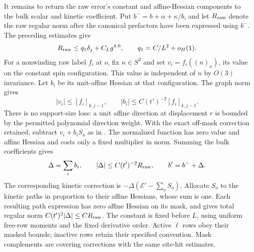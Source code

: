 It remains to return the raw error's constant and affine-Hessian
components to the bulk scalar and kinetic coefficient.  Put
$b^-=b+\alpha+\kappa/b$, and let $R_{\rm raw}$ denote the raw
regular norm after the canonical prefactors have been expressed using
$b^-$.  The preceding estimates give
\[
 R_{\rm raw}\le q_1\delta_j+C_Lg^{4.6},
 \qquad q_1=C/L^2+o_H(1).
\]
For a nonwinding raw label $f_i$ at $o$, fix $n\in S^2$ and set
$v_i=f_i((n)_x)$, its value on the constant spin configuration.
This value is independent of $n$ by $O(3)$ invariance.  Let $b_i$ be
its unit-affine Hessian at that configuration.  The graph norm gives
\[
 |v_i|\le[f_i]_{k,j-1},\qquad
 |b_i|\le C(t')^{-2}[f_i]_{k,j-1}.
\]
There is no support-size loss: a unit affine direction at displacement
$r$ is bounded by the permitted polynomial direction weight.  With
the exact off-mask correction retained, subtract $v_i+b_iS_o$ as in
.  The normalized function has zero
value and affine Hessian and costs only a fixed multiplier in norm.
Summing the bulk coefficients gives
\[
 \Delta=\sum_i b_i,
 \qquad |\Delta|\le C(t')^{-2}R_{\rm raw},
 \qquad b'=b^-+\Delta.
\]
The corresponding kinetic correction is
$-\Delta(\mathcal E'-\sum_oS_o)$.  Allocate $S_o$ to the kinetic
paths in proportion to their affine Hessians, whose sum is one.
Each resulting path expression has zero affine Hessian on its mask,
and  gives total regular norm
$C(t')^2|\Delta|\le CR_{\rm raw}$.  The constant is fixed before
$L$, using uniform free-row moments and the fixed derivative order.
Active $\ell$ rows obey their masked bounds; inactive rows retain
their specified convention.  Mask complements are covering
corrections with the same site-hit estimates.

